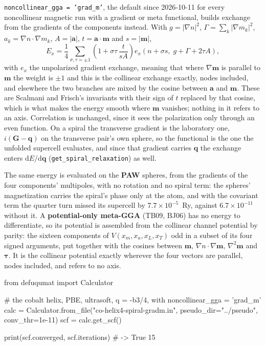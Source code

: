 \documentclass[11pt,a4paper]{article}
\newcommand{\code}[1]{\texttt{\small #1}}
\begin{document}
\code{noncollinear\_gga = 'grad\_m'}, the default since 2026-10-11 for every
noncollinear magnetic run with a gradient or meta functional, builds exchange from the
gradients of the components instead. With $g = |\nabla n|^2$,
$\Gamma = \sum_k|\nabla m_k|^2$, $a_k = \nabla n\cdot\nabla m_k$, $A = |\mathbf a|$,
$t = \mathbf a\cdot\mathbf m$ and $s = |\mathbf m|$,
\begin{equation*}
E_x = \frac14\sum_{\sigma,\tau=\pm1}\left(1 + \sigma\tau\,\frac{t}{sA}\right)
e_x\!\left(n + \sigma s,\; g + \Gamma + 2\tau A\right),
\end{equation*}
with $e_x$ the unpolarized gradient exchange, meaning that where $\nabla\mathbf m$
is parallel to $\mathbf m$ the weight is $\pm1$ and this is the collinear exchange
exactly, nodes included, and elsewhere the two branches are mixed by the cosine
between $\mathbf a$ and $\mathbf m$. These are Scalmani and Frisch's invariants
with their sign of $t$ replaced by that cosine, which is what makes the energy
smooth where $\mathbf m$ vanishes; nothing in it refers to an axis. Correlation
is unchanged, since it sees the polarization only through an even function. On a
spiral the transverse gradient is the laboratory one, $i(\mathbf G - \mathbf q)$
on the transverse pair's own sphere, so the functional is the one the unfolded
supercell evaluates, and since that gradient carries $\mathbf q$ the exchange enters
$\mathrm dE/\mathrm d\mathbf q$ (\code{get\_spiral\_relaxation}) as well.

The same energy is evaluated on the \textbf{PAW} spheres, from the gradients of the four
components' multipoles, with no rotation and no spiral term: the spheres' magnetization
carries the spiral's phase only at the atom, and with the covariant term the quarter turn
missed its supercell by $7.7\times10^{-5}$~Ry, against $6.7\times10^{-11}$ without it. A
\textbf{potential-only meta-GGA} (TB09, BJ06) has no energy to differentiate, so its
potential is assembled from the collinear channel potential by parity: the sixteen
components of $V(x_m, x_a, x_L, x_T)$ odd in a subset of its four signed arguments, put
together with the cosines between $\mathbf m$, $\nabla n\cdot\nabla\mathbf m$,
$\nabla^2\mathbf m$ and $\boldsymbol\tau$. It is the collinear potential exactly
wherever the four vectors are parallel, nodes included, and refers to no axis.

\begin{pycode}
from defuqumat import Calculator

# the cobalt helix, PBE, ultrasoft, q = -b3/4, with noncollinear_gga = 'grad_m'
calc = Calculator.from_file("co-helix4-spiral-gradm.in", pseudo_dir="../pseudo",
                            conv_thr=1e-11)
scf = calc.get_scf()

print(scf.converged, scf.iterations)   # -> True 15
\end{pycode}
\end{document}
